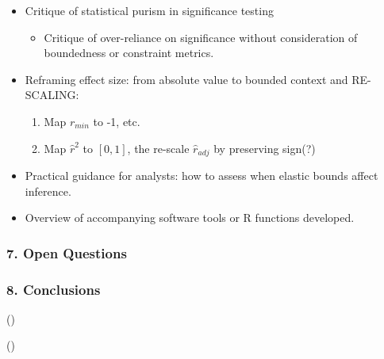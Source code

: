 \documentclass[
  12pt,
]{article}
\providecommand{\tightlist}{%
  \setlength{\itemsep}{0pt}\setlength{\parskip}{0pt}}\usepackage{longtable,booktabs,array}
\theoremstyle{plain}
\theoremstyle{definition}
\theoremstyle{remark}
\begin{document}
\begin{itemize}
\tightlist
\item
  Critique of statistical purism in significance testing

  \begin{itemize}
  \tightlist
  \item
    Critique of over-reliance on significance without consideration of
    boundedness or constraint metrics.
  \end{itemize}
\item
  Reframing effect size: from absolute value to bounded context and
  RE-SCALING:

  \begin{enumerate}
  \def\labelenumi{\arabic{enumi}.}
  \tightlist
  \item
    Map \(r_{min}\) to -1, etc.
  \item
    Map \(\hat{r}^2\) to \([0,1]\), the re-scale \(\hat{r}_{adj}\) by
    preserving sign(?)
  \end{enumerate}
\item
  Practical guidance for analysts: how to assess when elastic bounds
  affect inference.
\item
  Overview of accompanying software tools or R functions developed.
\end{itemize}

\subsubsection{\texorpdfstring{7. \textbf{Open
Questions}}{7. Open Questions}}\label{open-questions}

\subsubsection{\texorpdfstring{8.
\textbf{Conclusions}}{8. Conclusions}}\label{conclusions}

()

()

\newpage
\end{document}

